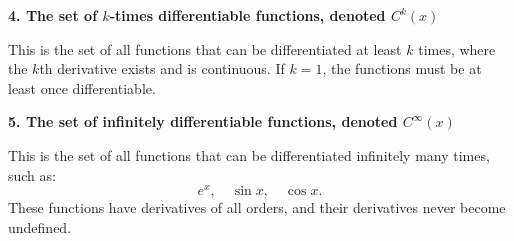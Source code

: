 \documentclass{article}
\begin{document}
\medskip
\noindent \textbf{4. The set of \( k \)-times differentiable functions, denoted \( C^k(x) \)}  

This is the set of all functions that can be differentiated at least \( k \) times, where the \( k \)th derivative exists and is continuous. If \( k = 1 \), the functions must be at least once differentiable.

\medskip
\noindent \textbf{5. The set of infinitely differentiable functions, denoted \( C^\infty(x) \)}  

This is the set of all functions that can be differentiated infinitely many times, such as:
\[
e^x, \quad \sin x, \quad \cos x.
\]
These functions have derivatives of all orders, and their derivatives never become undefined.
\end{document}

